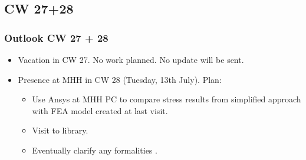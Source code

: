 \subsection{CW 27+28}
\begin{frame}
  \frametitle{Outlook CW 27 + 28}
	\begin{itemize}
		\item Vacation in CW 27. No work planned. No update will be sent.
		\item Presence at MHH in CW 28 (Tuesday, 13th July). Plan:
		\begin{itemize}
			\item Use Ansys at MHH PC to compare stress results from simplified approach with FEA model created at last visit.
			\item Visit to library.
			\item Eventually clarify any formalities .
		\end{itemize}
	\end{itemize}
\end{frame}


